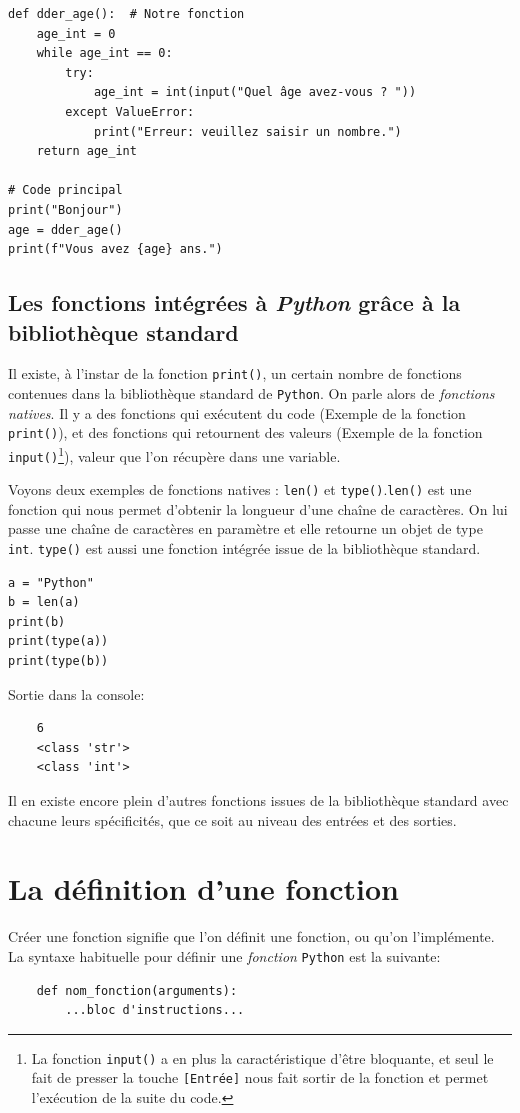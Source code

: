 \documentclass[a4paper,12pt]{book}
\begin{document}
\begin{lstlisting}[caption=Un premier exemple de fonction]
def dder_age():  # Notre fonction
    age_int = 0
    while age_int == 0:
        try:
            age_int = int(input("Quel âge avez-vous ? "))
        except ValueError:
            print("Erreur: veuillez saisir un nombre.")
    return age_int

# Code principal
print("Bonjour")
age = dder_age()
print(f"Vous avez {age} ans.")
\end{lstlisting}
\medskip

\subsection*{Les fonctions intégrées à \textit{Python} grâce à la bibliothèque standard}
Il existe, à l'instar de la fonction \texttt{print()}, un certain nombre de fonctions contenues dans la bibliothèque standard de \texttt{Python}. On parle alors de \textit{fonctions natives}. Il y a des fonctions qui exécutent du code (Exemple de la fonction \texttt{print()}), et des fonctions qui retournent des valeurs (Exemple de la fonction \texttt{input()}\footnote{La fonction \texttt{input()} a en plus la caractéristique d'être bloquante, et seul le fait de presser la touche \texttt{[Entrée]} nous fait sortir de la fonction et permet l'exécution de la suite du code.}), valeur que l'on récupère dans une variable.
\medskip

Voyons deux exemples de fonctions natives : \texttt{len()} et \texttt{type()}.\texttt{len()} est une fonction qui nous permet d'obtenir la longueur d'une chaîne de caractères. On lui passe une chaîne de caractères en paramètre et elle retourne un objet de type \texttt{int}. \texttt{type()} est aussi une fonction intégrée issue de la bibliothèque standard.
\begin{lstlisting}[caption=Les fonctions \texttt{len()} et \texttt{type()}]
a = "Python"
b = len(a)
print(b)
print(type(a))
print(type(b))
\end{lstlisting}
\medskip

Sortie dans la console: 
\begin{verbatim}
    6
    <class 'str'>
    <class 'int'>
\end{verbatim}
\medskip

Il en existe encore plein d'autres fonctions issues de la bibliothèque standard avec chacune leurs spécificités, que ce soit au niveau des entrées et des sorties.
\medskip

\section{La définition d'une fonction}
Créer une fonction signifie que l'on \og définit\fg{} une fonction, ou qu'on l'\og{}implémente\fg{}. La syntaxe habituelle pour définir une \textit{fonction} \texttt{Python} est la suivante:
\begin{verbatim}
    def nom_fonction(arguments):
        ...bloc d'instructions...
\end{verbatim}
\medskip
\end{document}
